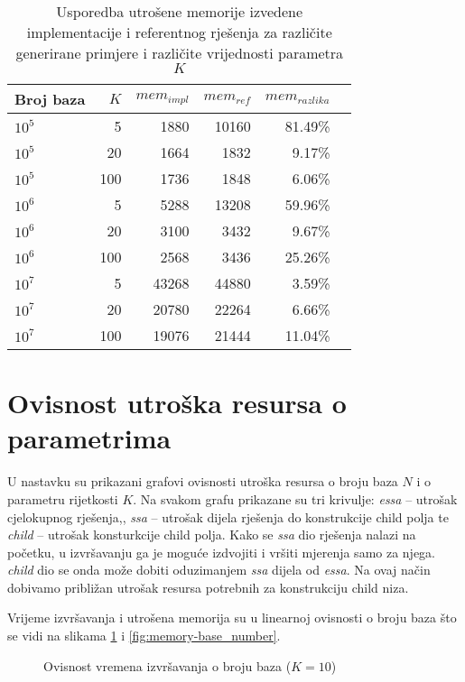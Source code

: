 \documentclass[times, utf8, seminar, numeric]{fer}
\begin{document}
\begin{table}[h]
	\centering
	\caption{Usporedba utrošene memorije izvedene implementacije i referentnog rješenja za različite generirane primjere i različite vrijednosti parametra $K$}
	\label{tbl:memory-generated}
	
	\begin{tabular}{lrrrrr}
		\hline
        Broj baza & $K$ & $mem_{impl}$ & $mem_{ref}$ & $mem_{razlika}$ \\ \hline
        $10^5$ & 5 & 1880 & 10160 & 81.49\% \\
        $10^5$ & 20 & 1664 & 1832 & 9.17\% \\
        $10^5$ & 100 & 1736 & 1848 & 6.06\% \\ \hline
        $10^6$ & 5 & 5288 & 13208 & 59.96\% \\
        $10^6$ & 20 & 3100 & 3432 & 9.67\% \\
        $10^6$ & 100 & 2568 & 3436 & 25.26\% \\ \hline
        $10^7$ & 5 & 43268 & 44880 & 3.59\% \\
        $10^7$ & 20 & 20780 & 22264 & 6.66\% \\
        $10^7$ & 100 & 19076 & 21444 & 11.04\% \\
    \hline
	\end{tabular}
\end{table}

\section{Ovisnost utroška resursa o parametrima}

U nastavku su prikazani grafovi ovisnosti utroška resursa o broju baza $N$ i o parametru rijetkosti $K$. Na svakom grafu prikazane su tri krivulje: \textit{essa} -- utrošak cjelokupnog rješenja,, \textit{ssa} -- utrošak dijela rješenja do konstrukcije child polja te \textit{child} -- utrošak konsturkcije child polja. Kako se \textit{ssa} dio rješenja nalazi na početku, u izvršavanju ga je moguće izdvojiti i vršiti mjerenja samo za njega. \textit{child} dio se onda može dobiti oduzimanjem \textit{ssa} dijela od \textit{essa}. Na ovaj način dobivamo približan utrošak resursa potrebnih za konstrukciju child niza.

Vrijeme izvršavanja i utrošena memorija su u linearnoj ovisnosti o broju baza što se vidi na slikama \ref{fig:time-base_number} i \ref{fig:memory-base_number}.

\begin{figure}[!h]
	\centering
	\def\svgwidth{.7\columnwidth}
	
  \caption{Ovisnost vremena izvršavanja o broju baza ($K = 10$)}
  \label{fig:time-base_number}
\end{figure}
\end{document}
